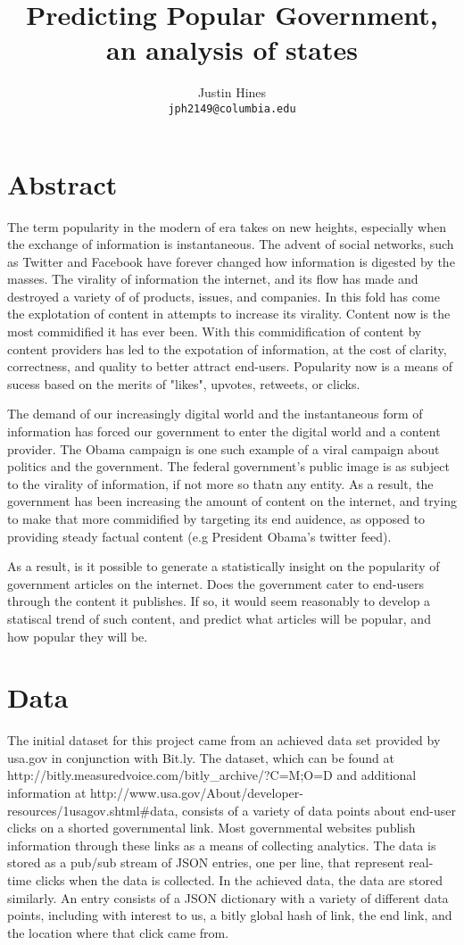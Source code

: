 \documentclass[11pt]{article}
\title{Predicting Popular Government, an analysis of states}
\author{Justin Hines\\
{\tt jph2149@columbia.edu}
}
\begin{document}
\maketile

\section{Abstract}

The term popularity in the modern of era takes on new heights, especially when the exchange of information is instantaneous.  The advent of social networks, such as Twitter and Facebook have forever changed how information is digested by the masses. The virality of information the internet, and its flow has made and destroyed a variety of of products, issues, and companies.  In this fold has come the explotation of content in attempts to increase its virality. Content now is the most commidified it has ever been. With this commidification of content by content providers has led to the expotation of information, at the cost of clarity, correctness, and quality to better attract end-users.  Popularity now is a means of sucess based on the merits of "likes", upvotes, retweets, or clicks. 

The demand of our increasingly digital world and the instantaneous form of information has forced our government to enter the digital world and a content provider.  The Obama campaign is one such example of a viral 
campaign about politics and the government.  The federal government's public image is as subject to the virality of information, if not more so thatn any entity. As a result, the government has been increasing the amount of content on the internet, and trying to make that more commidified by targeting its end auidence, as opposed to providing steady factual content (e.g President Obama's twitter feed). 

As a result, is it possible to generate a statistically insight on the popularity of government articles on the internet.  Does the government cater to end-users through the content it publishes.  If so, it would seem reasonably to develop a statiscal trend of such content, and predict what articles will be popular, and how popular they will be.



\section {Data}

The initial dataset for this project came from an achieved data set 
provided by usa.gov in conjunction with Bit.ly.  The dataset, which can 
be found at http://bitly.measuredvoice.com/bitly_archive/?C=M;O=D and 
additional information at http://www.usa.gov/About/developer-resources/1usagov.shtml#data, consists of a variety of data points about end-user 
clicks on a shorted governmental link.  Most governmental websites publish information through these links as a means of collecting analytics. 
The data is stored as a pub/sub stream of JSON entries, one per line, that represent real-time clicks when the data is collected.  In the achieved 
data, the data are stored similarly.  An entry consists of a JSON 
dictionary with a variety of different data points, including with interest to us, a bitly global hash of link, the end link, and the location where that click came from. 
\end{document}
